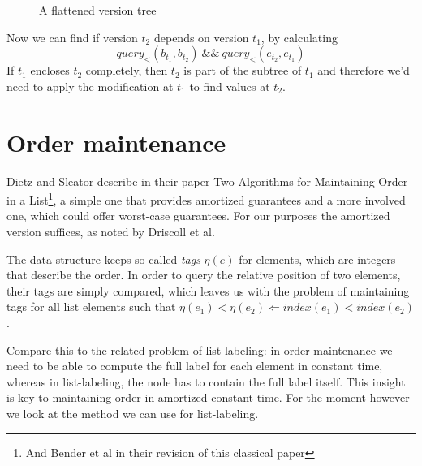 \documentclass[11pt,a4paper,twoside,openright]{Thesis}
\theoremstyle{definition}
\newcommand{\seclabel}[1]{\label{sec:#1}}
\begin{document}
\begin{figure}[htpb]
  \caption{A flattened version tree}
  \label{fig:flattening-tree}
\end{figure}

Now we can find if version $t_2$ depends on version $t_1$, by calculating
\[ query_<(b_{t_1}, b_{t_2})\ \mathrm{\&\&}\ query_<(e_{t_2}, e_{t_1})\]
If $t_1$ encloses $t_2$ completely, then $t_2$ is part of the subtree of $t_1$
and therefore we'd need to apply the modification at $t_1$ to find values at
$t_2$.

\section{Order maintenance}\seclabel{order-maintenance}
Dietz and Sleator describe in their paper Two Algorithms for Maintaining
Order in a List\cite{Diet87b}\footnote{And Bender et al\cite{Bend02a} in
their revision of this classical paper}, a simple one that provides amortized
guarantees and a more involved one, which could offer worst-case guarantees.
For our purposes the amortized version suffices, as noted by Driscoll et
al\cite[p. 108]{Dris89a}.

The data structure keeps so called \emph{tags} $\eta(e)$ for elements, which are
integers that describe the order. In order to query the relative position of
two elements, their tags are simply compared, which leaves us with the
problem of maintaining tags for all list elements such that
$\eta(e_1)<\eta(e_2) \Leftarrow index(e_1) < index(e_2)$.

Compare this to the related problem of list-labeling: in order maintenance we
need to be able to compute the full label for each element in constant time,
whereas in list-labeling, the node has to contain the full label itself. This
insight is key to maintaining order in amortized constant time. For the moment
however we look at the method we can use for list-labeling.
\end{document}
